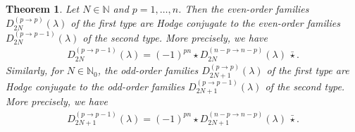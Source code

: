 \documentclass[a4paper,12pt,reqno]{amsart}
\newtheorem{theorem}{Theorem}
\numberwithin{theorem}{subsection}
\numberwithin{equation}{section}
\begin{document}
\begin{theorem}\label{Hodge-c} Let $N \in {\mathbb{N}}$ and $p=1,\dots,n$. Then the even-order families
$D^{(p\to p)}_{2N}(\lambda)$
of the first type are Hodge conjugate to the even-order families $D^{(p\to
p-1)}_{2N}(\lambda)$ of the second type. More precisely, we have
\begin{align}\label{Hodge1}
   D^{(p\to p-1)}_{2N}(\lambda) = (-1)^{pn} \star D^{(n-p \to n-p)}_{2N}(\lambda) \, \bar{\star}.
\end{align}
Similarly, for $N \in {\mathbb{N}}_0$, the odd-order families $D^{(p\to
p)}_{2N+1}(\lambda)$ of the first type are Hodge conjugate to the odd-order
families $D^{(p\to p-1)}_{2N+1}(\lambda)$ of the second type. More precisely,
we have
\begin{align}\label{Hodge2}
   D^{(p\to p-1)}_{2N+1}(\lambda) = (-1)^{pn}\star D^{(n-p \to n-p)}_{2N+1}(\lambda) \, \bar{\star}.
\end{align}
\end{theorem}
\end{document}
